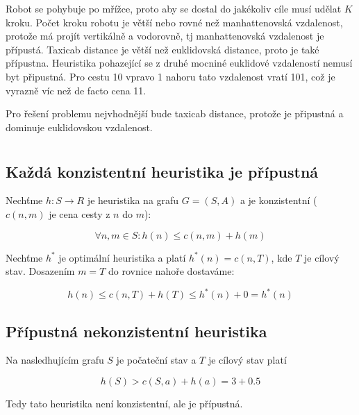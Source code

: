 \documentclass{article}
\begin{document}
Robot se pohybuje po mřížce, proto aby se dostal do jakékoliv cíle musí udělat $K$ kroku. Počet kroku robotu je větší nebo rovné než manhattenovská vzdalenost, protože má projít vertikálně a vodorovně, tj manhattenovská vzdalenost je přípustá. Taxicab distance je větší než euklidovská distance, proto je také přípustna. Heuristika pohazející se z druhé mocniné euklidové vzdaleností nemusí byt připustná. Pro cestu 10 vpravo 1 nahoru tato vzdalenost vratí 101, což je vyrazně víc než de facto cena 11.

Pro řešení problemu nejvhodnější bude taxicab distance, protože je připustná a dominuje euklidovskou vzdalenost.

\newpage
\section{}

\subsection{Každá konzistentní heuristika je přípustná}

Nechťme $h:S\rightarrow R$ je  heuristika na grafu $G=(S, A)$ a je konzistentní ($c(n,m)$ je cena cesty z $n$ do $m$):

\begin{equation*}
    \forall n,m \in S: h(n) \leq c(n, m) + h(m)
\end{equation*}

Nechťme $h^*$ je optimální heuristika a platí $h^*(n) = c(n, T)$, kde $T$ je cílový stav. Dosazením $m = T$ do rovnice nahoře dostaváme:

\begin{equation*}
    h(n) \leq c(n, T) + h(T) \leq h^*(n) + 0 = h^*(n)
\end{equation*}

\subsection{Přípustná nekonzistentní heuristika}

Na nasledhujícím grafu $S$ je počateční stav a $T$ je cílový stav platí

\begin{equation*}
    h(S) > c(S, a) + h(a)= 3 + 0.5
\end{equation*}

Tedy tato heuristika není konzistentní, ale je přípustná.
\end{document}
